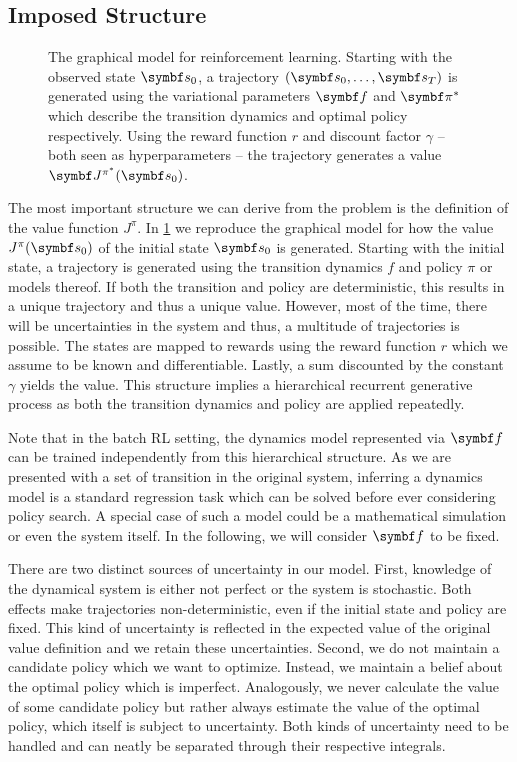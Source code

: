 \subsection{Imposed Structure}
\begin{figure}[t]
    \centering
    
    \caption{
        \label{fig:graphical_model}
        The graphical model for reinforcement learning.
        Starting with the observed state $\mat{s}_0$, a trajectory $\left( \mat{s}_0, \dots, \mat{s}_T \right)$ is generated using the variational parameters $\mat{f}$ and $\mat{\pi}^\ast$ which describe the transition dynamics and optimal policy respectively.
        Using the reward function $r$ and discount factor $\gamma$ -- both seen as hyperparameters -- the trajectory generates a value $\mat{J}^{\pi^\ast}(\mat{s}_0)$.
    }
\end{figure}
The most important structure we can derive from the problem is the definition of the value function $J^\pi$.
In \cref{fig:graphical_model} we reproduce the graphical model for how the value $J^\pi(\mat{s}_0)$ of the initial state $\mat{s}_0$ is generated.
Starting with the initial state, a trajectory is generated using the transition dynamics $f$ and policy $\pi$ or models thereof.
If both the transition and policy are deterministic, this results in a unique trajectory and thus a unique value.
However, most of the time, there will be uncertainties in the system and thus, a multitude of trajectories is possible.
The states are mapped to rewards using the reward function $r$ which we assume to be known and differentiable.
Lastly, a sum discounted by the constant $\gamma$ yields the value.
This structure implies a hierarchical recurrent generative process as both the transition dynamics and policy are applied repeatedly.

Note that in the batch RL setting, the dynamics model represented via $\mat{f}$ can be trained independently from this hierarchical structure.
As we are presented with a set of transition in the original system, inferring a dynamics model is a standard regression task which can be solved before ever considering policy search.
A special case of such a model could be a mathematical simulation or even the system itself.
In the following, we will consider $\mat{f}$ to be fixed.

There are two distinct sources of uncertainty in our model.
First, knowledge of the dynamical system is either not perfect or the system is stochastic.
Both effects make trajectories non-deterministic, even if the initial state and policy are fixed.
This kind of uncertainty is reflected in the expected value of the original value definition and we retain these uncertainties.
Second, we do not maintain a candidate policy which we want to optimize.
Instead, we maintain a belief about the optimal policy which is imperfect.
Analogously, we never calculate the value of some candidate policy but rather always estimate the value of the optimal policy, which itself is subject to uncertainty.
Both kinds of uncertainty need to be handled and can neatly be separated through their respective integrals.


